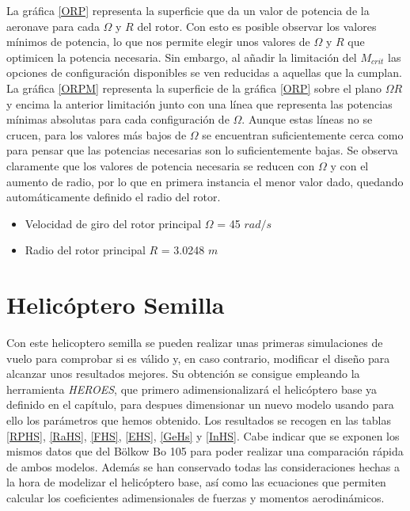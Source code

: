 La gráfica \ref{ORP} representa la superficie que da un valor de potencia de la aeronave para cada $\Omega$ y $R$ del rotor. Con esto es posible observar los valores mínimos de potencia, lo que nos permite elegir unos valores de $\Omega$ y $R$ que optimicen la potencia necesaria.
Sin embargo, al añadir la limitación del $M_{crit}$ las opciones de configuración disponibles se ven reducidas a aquellas que la cumplan. La gráfica \ref{ORPM} representa la superficie de la gráfica \ref{ORP} sobre el plano $\Omega R$ y encima la anterior limitación junto con una línea que representa las potencias mínimas absolutas para cada configuración de $\Omega$. Aunque estas líneas no se crucen, para los valores más bajos de $\Omega$ se encuentran suficientemente cerca como para pensar que las potencias necesarias son lo suficientemente bajas.
Se observa claramente que los valores de potencia necesaria se reducen con $\Omega$ y con el aumento de radio, por lo que en primera instancia el menor valor dado, quedando automáticamente definido el radio del rotor.

\begin{itemize}
	\item Velocidad de giro del rotor principal $\Omega$ = 45 $rad/s$
	\item Radio del rotor principal $R$ = 3.0248 $m$
\end{itemize}

\section{Helicóptero Semilla}

Con este helicoptero semilla se pueden realizar unas primeras simulaciones de vuelo para comprobar si es válido y, en caso contrario, modificar el diseño para alcanzar unos resultados mejores. Su obtención se consigue empleando la herramienta \emph{HEROES}, que primero adimensionalizará el helicóptero base ya definido en el capítulo, para despues dimensionar un nuevo modelo usando para ello los parámetros que hemos obtenido. Los resultados se recogen en las tablas \ref{RPHS}, \ref{RaHS}, \ref{FHS}, \ref{EHS}, \ref{GeHs} y \ref{InHS}.
Cabe indicar que se exponen los mismos datos que del Bölkow Bo 105 para poder realizar una comparación rápida de ambos modelos. Además se han conservado todas las consideraciones hechas a la hora de modelizar el helicóptero base, así como las ecuaciones que permiten calcular los coeficientes adimensionales de fuerzas y momentos aerodinámicos.

